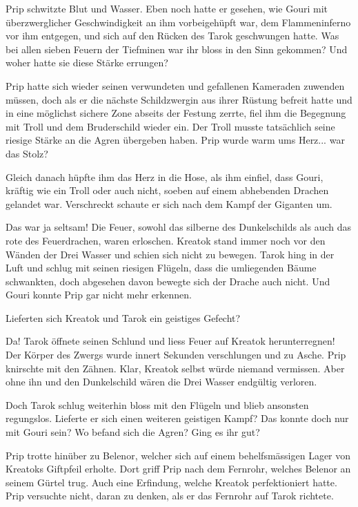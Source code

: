 \trennzeichen



Prip schwitzte Blut und Wasser. Eben noch hatte er gesehen, wie Gouri mit überzwerglicher Geschwindigkeit an ihm vorbeigehüpft war, dem Flammeninferno vor ihm entgegen, und sich auf den Rücken des Tarok geschwungen hatte. Was bei allen sieben Feuern der Tiefminen war ihr bloss in den Sinn gekommen? Und woher hatte sie diese Stärke errungen?

Prip hatte sich wieder seinen verwundeten und gefallenen Kameraden zuwenden müssen, doch als er die nächste Schildzwergin aus ihrer Rüstung befreit hatte und in eine möglichst sichere Zone abseits der Festung zerrte, fiel ihm die Begegnung mit Troll und dem Bruderschild wieder ein. Der Troll musste tatsächlich seine riesige Stärke an die Agren übergeben haben. Prip wurde warm ums Herz... war das Stolz?

Gleich danach hüpfte ihm das Herz in die Hose, als ihm einfiel, dass Gouri, kräftig wie ein Troll oder auch nicht, soeben auf einem abhebenden Drachen gelandet war. Verschreckt schaute er sich nach dem Kampf der Giganten um.

Das war ja seltsam! Die Feuer, sowohl das silberne des Dunkelschilds als auch das rote des Feuerdrachen, waren erloschen. Kreatok stand immer noch vor den Wänden der Drei Wasser und schien sich nicht zu bewegen. Tarok hing in der Luft und schlug mit seinen riesigen Flügeln, dass die umliegenden Bäume schwankten, doch abgesehen davon bewegte sich der Drache auch nicht. Und Gouri konnte Prip gar nicht mehr erkennen.

Lieferten sich Kreatok und Tarok ein geistiges Gefecht?

Da! Tarok öffnete seinen Schlund und liess Feuer auf Kreatok herunterregnen! Der Körper des Zwergs wurde innert Sekunden verschlungen und zu Asche. Prip knirschte mit den Zähnen. Klar, Kreatok selbst würde niemand vermissen. Aber ohne ihn und den Dunkelschild wären die Drei Wasser endgültig verloren.

Doch Tarok schlug weiterhin bloss mit den Flügeln und blieb ansonsten regungslos. Lieferte er sich einen weiteren geistigen Kampf? Das konnte doch nur mit Gouri sein? Wo befand sich die Agren? Ging es ihr gut?

Prip trotte hinüber zu Belenor, welcher sich auf einem behelfsmässigen Lager von Kreatoks Giftpfeil erholte. Dort griff Prip nach dem Fernrohr, welches Belenor an seinem Gürtel trug. Auch eine Erfindung, welche Kreatok perfektioniert hatte. Prip versuchte nicht, daran zu denken, als er das Fernrohr auf Tarok richtete.

